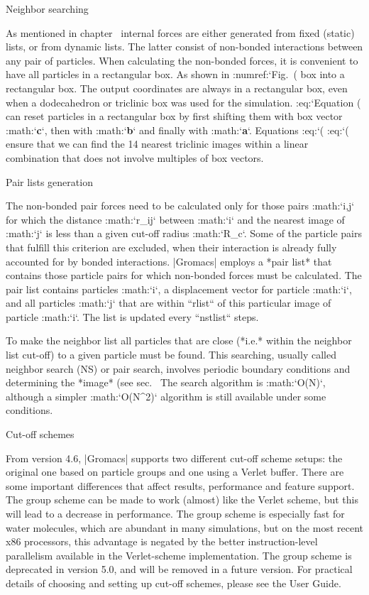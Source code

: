 Neighbor searching
~~~~~~~~~~~~~~~~~~

As mentioned in chapter 
internal forces are
either generated from fixed (static) lists, or from dynamic lists. The
latter consist of non-bonded interactions between any pair of particles.
When calculating the non-bonded forces, it is convenient to have all
particles in a rectangular box. As shown in
:numref:`Fig. (%
box into a rectangular box. The output coordinates are always in a
rectangular box, even when a dodecahedron or triclinic box was used for
the simulation. :eq:`Equation (%
can reset particles in a rectangular box by first shifting them with box
vector :math:`{\bf c}`, then with :math:`{\bf b}` and finally with
:math:`{\bf a}`. Equations :eq:`(%
:eq:`(%
ensure that we can find the 14 nearest triclinic images within a linear
combination that does not involve multiples of box vectors.

Pair lists generation
^^^^^^^^^^^^^^^^^^^^^

The non-bonded pair forces need to be calculated only for those pairs
:math:`i,j` for which the distance :math:`r_{ij}` between :math:`i` and
the nearest image
of :math:`j` is less than a given cut-off radius :math:`R_c`. Some of
the particle pairs that fulfill this criterion are excluded, when their
interaction is already fully accounted for by bonded interactions.
|Gromacs| employs a *pair list* that contains those particle pairs for
which non-bonded forces must be calculated. The pair list contains
particles :math:`i`, a displacement vector for particle :math:`i`, and
all particles :math:`j` that are within ``rlist`` of this particular
image of particle :math:`i`. The list is updated every ``nstlist``
steps.

To make the neighbor list
all
particles that are close (*i.e.* within the neighbor list cut-off) to a
given particle must be found. This searching, usually called neighbor
search (NS) or pair search, involves periodic boundary conditions and
determining the *image* (see sec. 
The
search algorithm is :math:`O(N)`, although a simpler :math:`O(N^2)`
algorithm is still available under some conditions.

Cut-off schemes
^^^^^^^^^^^^^^^

From version 4.6, |Gromacs| supports two different cut-off scheme setups:
the original one based on particle groups and one using a Verlet buffer.
There are some important differences that affect results, performance
and feature support. The group scheme can be made to work (almost) like
the Verlet scheme, but this will lead to a decrease in performance. The
group scheme is especially fast for water molecules, which are abundant
in many simulations, but on the most recent x86 processors, this
advantage is negated by the better instruction-level parallelism
available in the Verlet-scheme implementation. The group scheme is
deprecated in version 5.0, and will be removed in a future version. For
practical details of choosing and setting up cut-off schemes, please see
the User Guide.

